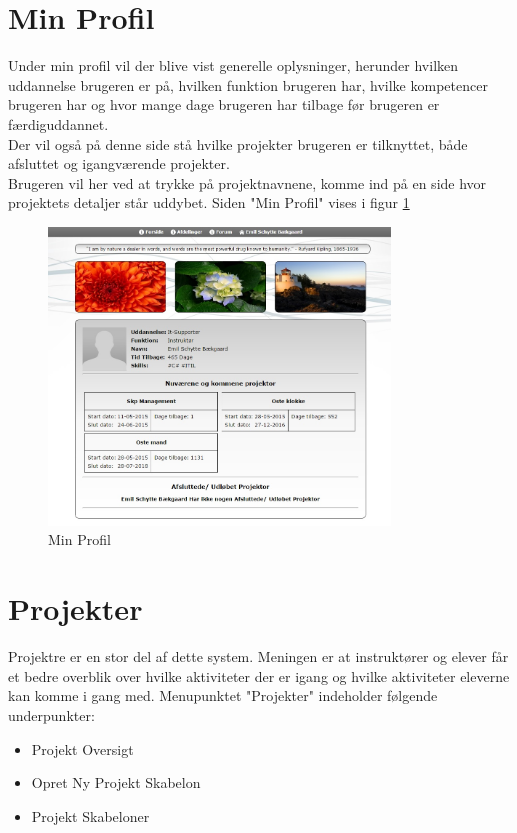 \documentclass{article}
\begin{document}
\newpage
\section{Min Profil}
Under min profil vil der blive vist generelle oplysninger, herunder hvilken uddannelse brugeren er på, hvilken funktion brugeren har, hvilke kompetencer brugeren har og hvor mange dage brugeren har tilbage før brugeren er færdiguddannet. \\
Der vil også på denne side stå hvilke projekter brugeren er tilknyttet, både afsluttet og igangværende projekter.\\
Brugeren vil her ved at trykke på projektnavnene, komme ind på en side hvor projektets detaljer står uddybet. Siden "Min Profil" vises i figur \ref{fig:3}

\begin{figure}[ht]
\includegraphics[width=343px]{minprofil.jpg}
\caption{Min Profil}
\label{fig:3}
\end{figure}
 \newpage
\section{Projekter}
Projektre er en stor del af dette system. Meningen er at instruktører og elever får et bedre overblik over hvilke aktiviteter der er igang og hvilke aktiviteter eleverne kan komme i gang med. Menupunktet "Projekter" indeholder følgende underpunkter:
\begin{itemize}
\item Projekt Oversigt
\item Opret Ny Projekt Skabelon
\item Projekt Skabeloner
\end{itemize}
\newpage
\end{document}
